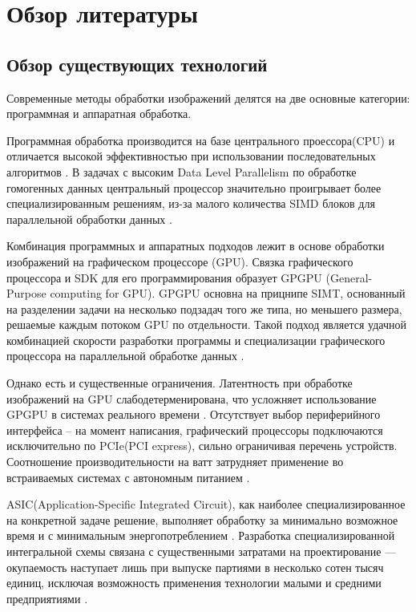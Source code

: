 \section{Обзор литературы}
\label{sec:domain}

\subsection{Обзор существующих технологий}
\label{sub:domain:technologies_review}

Современные методы обработки изображений делятся на две основные категории: программная и аппаратная обработка.

Программная обработка производится на базе центрального проессора(CPU) и отличается высокой эффективностью
при использовании последовательных алгоритмов \cite{asano_dip_comp}. В задачах с высоким Data Level Parallelism по обработке гомогенных данных
центральный процессор значительно проигрывает более специализированным решениям,
из-за малого количества SIMD блоков для параллельной обработки данных \cite{axell_cpu_simd}.

Комбинация программных и аппаратных подходов лежит в основе обработки изображений на графическом процессоре (GPU).
Связка графического процессора и SDK для его программирования образует GPGPU (General-Purpose computing for GPU).
GPGPU основна на прицнипе SIMT, основанный на разделении задачи на несколько подзадач того же типа, но меньшего размера,
решаемые каждым потоком GPU по отдельности.
Такой подход является удачной комбинацией скорости разработки программы и специализации графического процессора
на параллельной обработке данных \cite{patterson_hennessy}.

Однако есть и существенные ограничения.
Латентность при обработке изображений на GPU слабодетерменирована, что усложняет использование GPGPU
в системах реального времени \cite{maceina_gpu_real_time}.
Отсутствует выбор периферийного интерфейса -- на момент написания,
графический процессоры подключаются исключительно по PCIe(PCI express), сильно ограничивая перечень устройств.
Соотношение производительности на ватт затрудняет применение во встраиваемых системах с автономным питанием \cite{fowers_gpu_power_consumption}.

ASIC(Application-Specific Integrated Circuit), как наиболее специализированное на конкретной задаче решение, выполняет обработку за минимально возможное время
и с минимальным энергопотреблением \cite{amara_asic_low_power}. Разработка специализированной интегральной схемы связана
с существенными затратами на проектирование --- окупаемость наступает лишь при выпуске партиями в несколько сотен тысяч единиц,
исключая возможность применения технологии малыми и средними предприятиями \cite{smith_asic_economy}.

